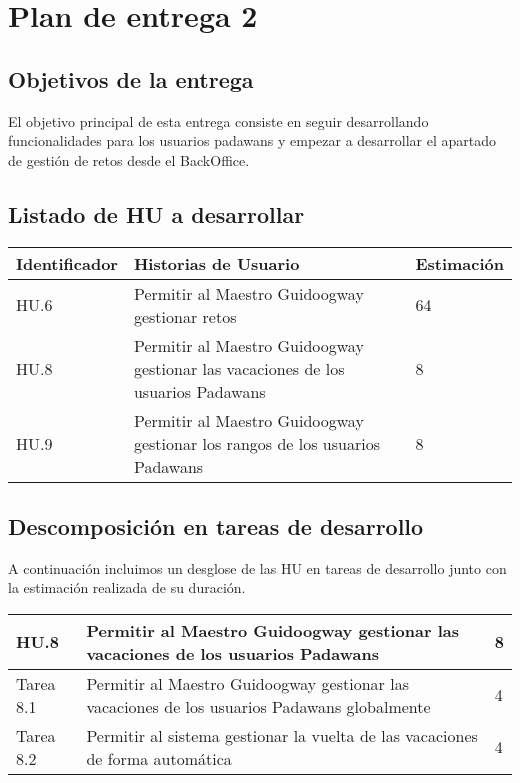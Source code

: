\section{Plan de entrega 2}

\subsection{Objetivos de la entrega}

El objetivo principal de esta entrega consiste en seguir desarrollando funcionalidades para los usuarios padawans y empezar a desarrollar el apartado de gestión de retos desde el BackOffice.

\subsection{Listado de HU a desarrollar}

\begin{table}[h]
	\centering
	\begin{tabular}{| p{2.3cm} | p{6.7cm} | p{2cm} |}
		\rowcolor[HTML]{329A9D} 
		{\color[HTML]{FFFFFF} \textbf{Identificador}} & {\color[HTML]{FFFFFF} \textbf{Historias de Usuario}} & {\color[HTML]{FFFFFF} \textbf{Estimación}}  \\ \hline
		HU.6 & Permitir al Maestro Guidoogway gestionar retos & 64 \\ \hline
		HU.8 & Permitir al Maestro Guidoogway gestionar las vacaciones de los usuarios Padawans & 8 \\ \hline
		HU.9 & Permitir al Maestro Guidoogway gestionar los rangos de los usuarios Padawans & 8 \\ \hline
	\end{tabular}
\end{table}

\subsection{Descomposición en tareas de desarrollo}

A continuación incluimos un desglose de las HU en tareas de desarrollo junto con la estimación realizada de su duración.\\

\begin{table}[h]
	\centering
	\begin{tabular}{| p{2.3cm} | p{6.7cm} | p{2cm} |}
		\rowcolor[HTML]{329A9D} 
		{\color[HTML]{FFFFFF} \textbf{HU.8}} & {\color[HTML]{FFFFFF} \textbf{Permitir al Maestro Guidoogway gestionar las vacaciones de los usuarios Padawans}} & {\color[HTML]{FFFFFF} \textbf{8}}  \\ \hline
		Tarea 8.1 & Permitir al Maestro Guidoogway gestionar las vacaciones de los usuarios Padawans globalmente & 4 \\ \hline
		Tarea 8.2 & Permitir al sistema gestionar la vuelta de las vacaciones de forma automática & 4 \\ \hline
	\end{tabular}
\end{table}

